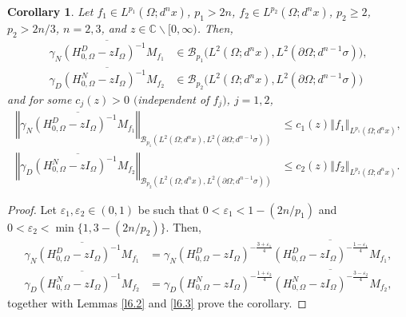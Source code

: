 \documentclass[reqno,10pt, centertags]{amsart}
\newcommand{\bbC}{{\mathbb{C}}}
\newcommand{\cB}{{\mathcal B}}
\newcommand{\norm}[1]{\left\Vert#1\right\Vert}
\newcommand{\lb}{\label}
\newcommand{\ol}{\overline}
\newcommand{\eps}{\varepsilon}
\newcommand{\ga}{\gamma}
\newcommand{\si}{\sigma}
\newcommand{\Om}{\Omega}
\newcommand{\dOm}{{\partial\Omega}}
\numberwithin{equation}{section}
\newtheorem{corollary}[theorem]{Corollary}
\theoremstyle{definition}
\begin{document}
\begin{corollary} \lb{c6.4}
Let $f_1\in L^{p_1}(\Om;d^nx)$, $p_1>2n$, $f_2\in L^{p_2}(\Om;d^nx)$,
$p_2\geq 2$, $p_2>2n/3$, $n=2, 3$, and $z\in\bbC\backslash[0,\infty)$.
Then,
\begin{align}
\ol{\ga_N(H_{0,\Om}^D-zI_{\Om})^{-1}M_{f_1}} &\in
\cB_{p_1}\big(L^2(\Om;d^nx),L^2(\dOm;d^{n-1}\si)\big),   \lb{6.50}
\\
\ol{\ga_D(H_{0,\Om}^N-zI_{\Om})^{-1}M_{f_2}} &\in
\cB_{p_2}\big(L^2(\Om;d^nx),L^2(\dOm;d^{n-1}\si)\big)   \lb{6.51}
\end{align}
and for some $c_j(z)>0$ $($independent of $f_j$$)$, $j=1,2$,
\begin{align}
\norm{\ol{\ga_N(H_{0,\Om}^D-zI_{\Om})^{-1}M_{f_1}}}_
{\cB_{p_1}(L^2(\Om;d^nx),L^2(\dOm;d^{n-1}\si))} &\leq
c_1(z) \norm{f_1}_{L^{p_1}(\Om;d^nx)}, \lb{6.25}
\\
\norm{\ol{\ga_D(H_{0,\Om}^N-zI_{\Om})^{-1}M_{f_2}}}_
{\cB_{p_2}(L^2(\Om;d^nx),L^2(\dOm;d^{n-1}\si))} &\leq
c_2(z) \norm{f_2}_{L^{p_2}(\Om;d^nx)}. \lb{6.26}
\end{align}
\end{corollary}
\begin{proof}
Let $\eps_1,\eps_2\in (0,1)$ be such that $0<\eps_1<1-(2n/p_1)$ and
$0<\eps_2<\min\{1,3-(2n/p_2)\}$. Then,
\begin{align}
\ol{\ga_N(H_{0,\Om}^D-zI_{\Om})^{-1}M_{f_1}} &=
\ga_N(H_{0,\Om}^D-zI_{\Om})^{-\frac{3+\eps_1}{4}}
\ol{(H_{0,\Om}^D-zI_{\Om})^{-\frac{1-\eps_1}{4}}M_{f_1}},
\\
\ol{\ga_D(H_{0,\Om}^N-zI_{\Om})^{-1}M_{f_2}} &=
\ga_D(H_{0,\Om}^N-zI_{\Om})^{-\frac{1+\eps_2}{4}}
\ol{(H_{0,\Om}^N-zI_{\Om})^{-\frac{3-\eps_2}{4}}M_{f_2}},
\end{align}
together with Lemmas \ref{l6.2} and \ref{l6.3} prove the corollary.
\end{proof}
\end{document}
